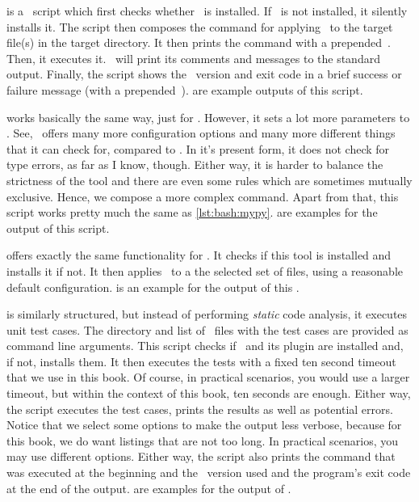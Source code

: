  is a \bash\ script which first checks whether \mypy\ is installed.
If \mypy\ is not installed, it silently installs it.
The script then composes the command for applying \mypy\ to the target file(s) in the target directory.
It then prints the command with a prepended~\expandafter\textil{\$}.
Then, it executes it.
\mypy\ will print its comments and messages to the standard output.
Finally, the script shows the \mypy\ version and exit code in a brief success or failure message (with a prepended~\expandafter\textil{\#}).
 are example outputs of this script.

 works basically the same way, just for \ruff.
However, it sets a lot more parameters to \ruff.
See, \ruff\ offers many more configuration options and many more different things that it can check for, compared to \mypy.
In it's present form, it does not check for type errors, as far as I know, though.
Either way, it is harder to balance the strictness of the tool and there are even some rules which are sometimes mutually exclusive.
Hence, we compose a more complex command.
Apart from that, this script works pretty much the same as \cref{lst:bash:mypy}.
 are examples for the output of this script.

 offers exactly the same functionality for \pylint.
It checks if this tool is installed and installs it if not.
It then applies \pylint\ to a the selected set of files, using a reasonable default configuration.
 is an example for the output of this .

 is similarly structured, but instead of performing \emph{static} code analysis, it executes unit test cases.
The directory and list of \python\ files with the test cases are provided as command line arguments.
This script checks if \pytest\ and its plugin  are installed and, if not, installs them.
It then executes the tests with a fixed ten second timeout that we use in this book.
Of course, in practical scenarios, you would use a larger timeout, but within the context of this book, ten seconds are enough.
Either way, the script executes the test cases, prints the results as well as potential errors.
Notice that we select some options to make the output less verbose, because for this book, we do want listings that are not too long.
In practical scenarios, you may use different options.
Either way, the script also prints the command that was executed at the beginning and the \pytest\ version used and the program's exit code at the end of the output.
 are examples for the output of \pytest.%
%
\endhsection%
%
